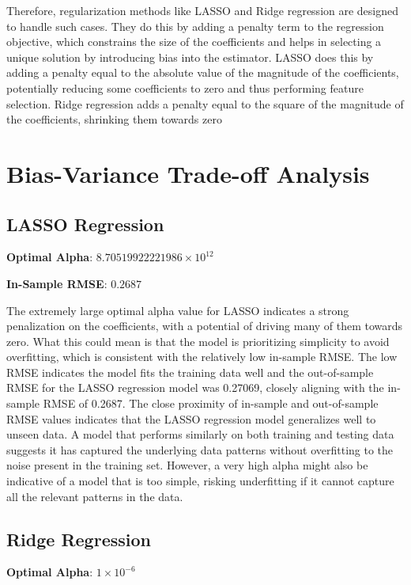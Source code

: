 \documentclass[12pt]{article}
\begin{document}
Therefore, regularization methods like LASSO and Ridge regression are designed to handle such cases. They do this by adding a penalty term to the regression objective, which constrains the size of the coefficients and helps in selecting a unique solution by introducing bias into the estimator. LASSO does this by adding a penalty equal to the absolute value of the magnitude of the coefficients, potentially reducing some coefficients to zero and thus performing feature selection. Ridge regression adds a penalty equal to the square of the magnitude of the coefficients, shrinking them towards zero 

\section{Bias-Variance Trade-off Analysis}

\subsection{LASSO Regression}

\textbf{Optimal Alpha}: \(8.70519922221986 \times 10^{12}\)

\textbf{In-Sample RMSE}: \(0.2687\)

The extremely large optimal alpha value for LASSO indicates a strong penalization on the coefficients, with a potential of driving many of them towards zero. What this could mean is  that the model is prioritizing simplicity to avoid overfitting, which is consistent with the relatively low in-sample RMSE. The low RMSE indicates the model fits the training data well and the out-of-sample RMSE for the LASSO regression model was  0.27069, closely aligning with the in-sample RMSE of  0.2687. The close proximity of in-sample and out-of-sample RMSE values indicates that the LASSO regression model generalizes well to unseen data. A model that performs similarly on both training and testing data suggests it has captured the underlying data patterns without overfitting to the noise present in the training set. However, a very high alpha might also be indicative of a model that is too simple, risking underfitting if it cannot capture all the relevant patterns in the data.

\subsection{Ridge Regression}

\textbf{Optimal Alpha}: \(1 \times 10^{-6}\)
\end{document}

